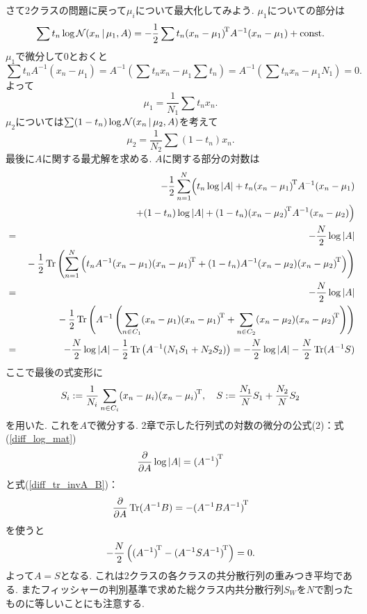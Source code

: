 さて2クラスの問題に戻って$\mu_i$について最大化してみよう. $\mu_1$についての部分は
$$
\sum t_n \log {\cal N}(x_n\,|\,\mu_1,A)=-\frac{1}{2}\sum t_n {(x_n-\mu_1)}^{\!\mathrm{T}} A^{-1} {(x_n-\mu_1)} + \text{const.}
$$
$\mu_1$で微分して$0$とおくと
$$
\sum t_n A^{-1}(x_n-\mu_1)=A^{-1} \left(\sum t_n x_n - \mu_1 \sum t_n\right)=A^{-1} \left(\sum t_n x_n - \mu_1 N_1\right)=0.
$$
よって
$$\mu_1=\frac{1}{N_1}\sum t_n x_n.
$$
$\mu_2$については$\sum (1-t_n) \log {\cal N}(x_n\,|\,\mu_2,A)$を考えて
$$
\mu_2=\frac{1}{N_2}\sum (1-t_n)x_n.
$$
最後に$A$に関する最尤解を求める. $A$に関する部分の対数は
\begin{eqnarray*}
 && -\frac{1}{2}\sum_{n=1}^N\Bigl(t_n \log |A|+t_n {(x_n-\mu_1)}^{\!\mathrm{T}}A^{-1}(x_n-\mu_1)\\
 &&+(1-t_n) \log |A|+(1-t_n){(x_n-\mu_2)}^{\!\mathrm{T}}A^{-1}(x_n-\mu_2)\Bigr)\\
 &=& -\frac{N}{2}\log |A|\\
 &&{}-\frac{1}{2} \mathop{\mathrm{Tr}}\nolimits\left(\sum_{n=1}^N\left(t_n A^{-1}(x_n -\mu_1){(x_n-\mu_1)}^{\!\mathrm{T}}+(1-t_n)A^{-1}(x_n-\mu_2){(x_n-\mu_2)}^{\!\mathrm{T}}\right)\right)\\
 &=& -\frac{N}{2}\log |A|\\
 &&{}-\frac{1}{2} \mathop{\mathrm{Tr}}\nolimits\left(A^{-1}\left(\sum_{n\in C_1}(x_n-\mu_1){(x_n-\mu_1)}^{\!\mathrm{T}}+\sum_{n\in C_2}(x_n-\mu_2){(x_n-\mu_2)}^{\!\mathrm{T}}\right)\right)\\
 &=& -\frac{N}{2}\log |A| -\frac{1}{2} \mathop{\mathrm{Tr}}\nolimits\left(A^{-1}(N_1 S_1 + N_2 S_2)\right)
 = -\frac{N}{2}\log |A| -\frac{N}{2} \mathop{\mathrm{Tr}}\nolimits(A^{-1}S)
\end{eqnarray*}
ここで最後の式変形に
$$
S_i:=\frac{1}{N_i}\sum_{n\in C_i}(x_n-\mu_i){(x_n-\mu_i)}^{\!\mathrm{T}},
\quad
S:=\frac{N_1}{N}S_1+\frac{N_2}{N} S_2
$$
を用いた. これを$A$で微分する.
2章で示した行列式の対数の微分の公式(2)：式(\ref{diff_log_mat})
$$
\frac{\partial}{\partial A}\log|A|={(A^{-1})}^{\!\mathrm{T}}
$$
と式(\ref{diff_tr_invA_B})：
$$
\frac{\partial}{\partial A}\mathop{\mathrm{Tr}}\nolimits(A^{-1}B)=-{(A^{-1}BA^{-1})}^{\!\mathrm{T}}
$$
を使うと
$$
-\frac{N}{2}\left({(A^{-1})}^{\!\mathrm{T}}-{(A^{-1}SA^{-1})}^{\!\mathrm{T}}\right)=0.
$$
よって$A=S$となる. これは2クラスの各クラスの共分散行列の重みつき平均である.
またフィッシャーの判別基準で求めた総クラス内共分散行列$S_W$を$N$で割ったものに等しいことにも注意する.

